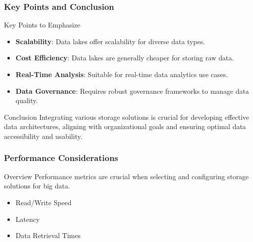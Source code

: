 \documentclass[aspectratio=169]{beamer}
\begin{document}
\begin{frame}[fragile]
    \frametitle{Key Points and Conclusion}
    \begin{block}{Key Points to Emphasize}
        \begin{itemize}
            \item \textbf{Scalability}: Data lakes offer scalability for diverse data types.
            \item \textbf{Cost Efficiency}: Data lakes are generally cheaper for storing raw data.
            \item \textbf{Real-Time Analysis}: Suitable for real-time data analytics use cases.
            \item \textbf{Data Governance}: Requires robust governance frameworks to manage data quality.
        \end{itemize}
    \end{block}
    \begin{block}{Conclusion}
        Integrating various storage solutions is crucial for developing effective data architectures, aligning with organizational goals and ensuring optimal data accessibility and usability.
    \end{block}
\end{frame}

\begin{frame}
    \frametitle{Performance Considerations}
    \begin{block}{Overview}
        Performance metrics are crucial when selecting and configuring storage solutions for big data.
    \end{block}
    \begin{itemize}
        \item Read/Write Speed
        \item Latency
        \item Data Retrieval Times
    \end{itemize}
\end{frame}
\end{document}
